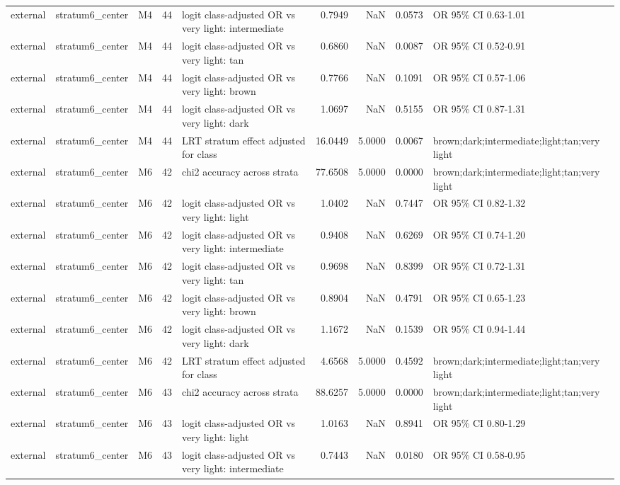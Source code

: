 \begin{tabular}{lllrlrrrl}
external & stratum6\_center & M4 & 44 & logit class-adjusted OR vs very light: intermediate & 0.7949 & NaN & 0.0573 & OR 95\% CI 0.63-1.01 \\
external & stratum6\_center & M4 & 44 & logit class-adjusted OR vs very light: tan & 0.6860 & NaN & 0.0087 & OR 95\% CI 0.52-0.91 \\
external & stratum6\_center & M4 & 44 & logit class-adjusted OR vs very light: brown & 0.7766 & NaN & 0.1091 & OR 95\% CI 0.57-1.06 \\
external & stratum6\_center & M4 & 44 & logit class-adjusted OR vs very light: dark & 1.0697 & NaN & 0.5155 & OR 95\% CI 0.87-1.31 \\
external & stratum6\_center & M4 & 44 & LRT stratum effect adjusted for class & 16.0449 & 5.0000 & 0.0067 & brown;dark;intermediate;light;tan;very light \\
external & stratum6\_center & M6 & 42 & chi2 accuracy across strata & 77.6508 & 5.0000 & 0.0000 & brown;dark;intermediate;light;tan;very light \\
external & stratum6\_center & M6 & 42 & logit class-adjusted OR vs very light: light & 1.0402 & NaN & 0.7447 & OR 95\% CI 0.82-1.32 \\
external & stratum6\_center & M6 & 42 & logit class-adjusted OR vs very light: intermediate & 0.9408 & NaN & 0.6269 & OR 95\% CI 0.74-1.20 \\
external & stratum6\_center & M6 & 42 & logit class-adjusted OR vs very light: tan & 0.9698 & NaN & 0.8399 & OR 95\% CI 0.72-1.31 \\
external & stratum6\_center & M6 & 42 & logit class-adjusted OR vs very light: brown & 0.8904 & NaN & 0.4791 & OR 95\% CI 0.65-1.23 \\
external & stratum6\_center & M6 & 42 & logit class-adjusted OR vs very light: dark & 1.1672 & NaN & 0.1539 & OR 95\% CI 0.94-1.44 \\
external & stratum6\_center & M6 & 42 & LRT stratum effect adjusted for class & 4.6568 & 5.0000 & 0.4592 & brown;dark;intermediate;light;tan;very light \\
external & stratum6\_center & M6 & 43 & chi2 accuracy across strata & 88.6257 & 5.0000 & 0.0000 & brown;dark;intermediate;light;tan;very light \\
external & stratum6\_center & M6 & 43 & logit class-adjusted OR vs very light: light & 1.0163 & NaN & 0.8941 & OR 95\% CI 0.80-1.29 \\
external & stratum6\_center & M6 & 43 & logit class-adjusted OR vs very light: intermediate & 0.7443 & NaN & 0.0180 & OR 95\% CI 0.58-0.95 \\

\end{tabular}
